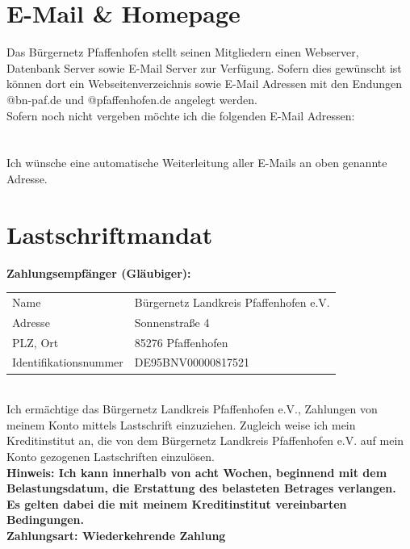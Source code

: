 \documentclass[a4paper,10pt]{article}
\newcommand{\UnderlinedField}[3][]{\TextField[name=#2,width=#3,bordercolor=black,borderstyle=U,#1]{}}
\begin{document}
\begin{Form}
\section*{E-Mail \& Homepage}

Das Bürgernetz Pfaffenhofen stellt seinen Mitgliedern einen Webserver, Datenbank Server sowie E-Mail Server zur Verfügung. Sofern dies gewünscht ist können dort ein Webseitenverzeichnis sowie E-Mail Adressen mit den Endungen @bn-paf.de und @pfaffenhofen.de angelegt werden.
\\
Sofern noch nicht vergeben möchte ich die folgenden E-Mail Adressen: \\
	\UnderlinedField{mailAddresses}{\textwidth} \\
\\
\CheckBox[name=forwardMails,bordercolor=black,checkboxsymbol=\ding{54}]{} Ich wünsche eine automatische Weiterleitung aller E-Mails an oben genannte Adresse.



\section*{Lastschriftmandat}
\fbox
{
	\begin{minipage}{\textwidth}
		\textbf{Zahlungsempfänger (Gläubiger):} \\
		\begin{tabular}{l l}
			Name					& Bürgernetz Landkreis Pfaffenhofen e.V. \\
			Adresse					& Sonnenstraße 4 \\
			PLZ, Ort				& 85276 Pfaffenhofen \\
			Identifikationsnummer	& DE95BNV00000817521 \\
		\end{tabular}
		\\

		Ich ermächtige das Bürgernetz Landkreis Pfaffenhofen e.V.,
		Zahlungen von meinem Konto mittels Lastschrift einzuziehen.
		Zugleich weise ich mein Kreditinstitut an, die von dem
		Bürgernetz Landkreis Pfaffenhofen e.V. auf mein Konto gezogenen
		Lastschriften einzulösen.
		\\
		
		\textbf{Hinweis: Ich kann innerhalb von acht Wochen, beginnend
		mit dem Belastungsdatum, die Erstattung des belasteten
		Betrages verlangen. Es gelten dabei die mit meinem
		Kreditinstitut vereinbarten Bedingungen.}
		\\
		
		\textbf{Zahlungsart: Wiederkehrende Zahlung}
		\\
		

\end{minipage}}
\end{Form}
\end{document}
